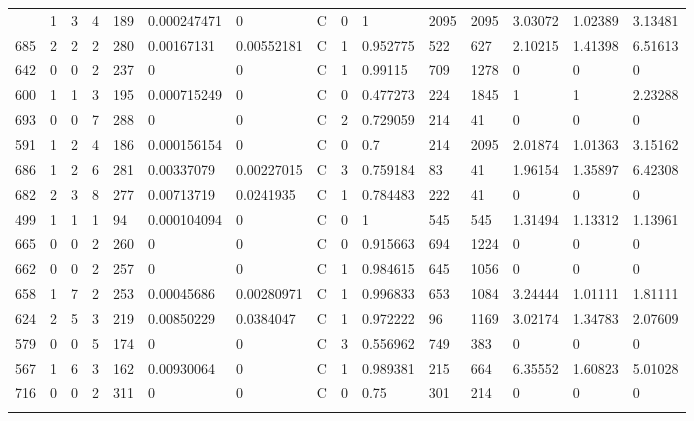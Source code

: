 \begin{latin}
\begin{longtable}{lllllllllllllll}
\begin{comment}
	594 & 1  & 3   & 4  & 189 & 0.000247471    & 0              & C & 0  & 1        & 2095 & 2095 & 3.03072 & 1.02389 & 3.13481 \\
	685 & 2  & 2   & 2  & 280 & 0.00167131     & 0.00552181     & C & 1  & 0.952775 & 522  & 627  & 2.10215 & 1.41398 & 6.51613 \\
	642 & 0  & 0   & 2  & 237 & 0              & 0              & C & 1  & 0.99115  & 709  & 1278 & 0       & 0       & 0       \\
	600 & 1  & 1   & 3  & 195 & 0.000715249    & 0              & C & 0  & 0.477273 & 224  & 1845 & 1       & 1       & 2.23288 \\
	693 & 0  & 0   & 7  & 288 & 0              & 0              & C & 2  & 0.729059 & 214  & 41   & 0       & 0       & 0       \\
	591 & 1  & 2   & 4  & 186 & 0.000156154    & 0              & C & 0  & 0.7      & 214  & 2095 & 2.01874 & 1.01363 & 3.15162 \\
	686 & 1  & 2   & 6  & 281 & 0.00337079     & 0.00227015     & C & 3  & 0.759184 & 83   & 41   & 1.96154 & 1.35897 & 6.42308 \\
	682 & 2  & 3   & 8  & 277 & 0.00713719     & 0.0241935      & C & 1  & 0.784483 & 222  & 41   & 0       & 0       & 0       \\
	499 & 1  & 1   & 1  & 94  & 0.000104094    & 0              & C & 0  & 1        & 545  & 545  & 1.31494 & 1.13312 & 1.13961 \\
	665 & 0  & 0   & 2  & 260 & 0              & 0              & C & 0  & 0.915663 & 694  & 1224 & 0       & 0       & 0       \\
	662 & 0  & 0   & 2  & 257 & 0              & 0              & C & 1  & 0.984615 & 645  & 1056 & 0       & 0       & 0       \\
	658 & 1  & 7   & 2  & 253 & 0.00045686     & 0.00280971     & C & 1  & 0.996833 & 653  & 1084 & 3.24444 & 1.01111 & 1.81111 \\
	624 & 2  & 5   & 3  & 219 & 0.00850229     & 0.0384047      & C & 1  & 0.972222 & 96   & 1169 & 3.02174 & 1.34783 & 2.07609 \\
	579 & 0  & 0   & 5  & 174 & 0              & 0              & C & 3  & 0.556962 & 749  & 383  & 0       & 0       & 0       \\
	567 & 1  & 6   & 3  & 162 & 0.00930064     & 0              & C & 1  & 0.989381 & 215  & 664  & 6.35552 & 1.60823 & 5.01028 \\
	716 & 0  & 0   & 2  & 311 & 0              & 0              & C & 0  & 0.75     & 301  & 214  & 0       & 0       & 0       \\

\end{comment}
\end{longtable}
\end{latin}
